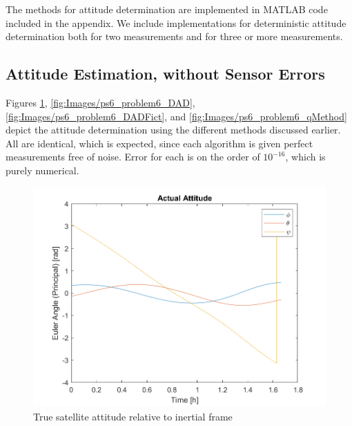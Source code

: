 The methods for attitude determination are implemented in MATLAB code included in the appendix. We include implementations for deterministic attitude determination both for two measurements and for three or more measurements.

\subsection{Attitude Estimation, without Sensor Errors}
Figures \ref{fig:Images/ps6_problem6_actual}, \ref{fig:Images/ps6_problem6_DAD}, \ref{fig:Images/ps6_problem6_DADFict}, and \ref{fig:Images/ps6_problem6_qMethod} depict the attitude determination using the different methods discussed earlier. All are identical, which is expected, since each algorithm is given perfect measurements free of noise. Error for each is on the order of $10^{-16}$, which is purely numerical.

\begin{figure}[H]
\centering
\includegraphics[scale=0.8]{Images/ps6_problem6_actual.png}
\caption{True satellite attitude relative to inertial frame}
\label{fig:Images/ps6_problem6_actual}
\end{figure}

